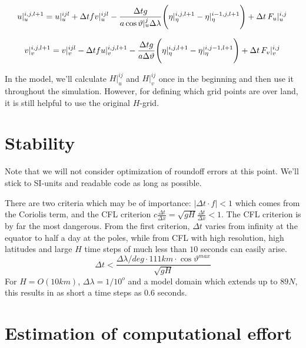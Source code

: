 \documentclass[a4paper]{article}
\begin{document}
\begin{equation}
  u|_u^{i,j,l+1} = u|_u^{ijl} 
    + \Delta t f v|_u^{ijl}
    - \frac{\Delta t g}{a\cos\vartheta|_u^j\Delta\lambda}
      \Biggl(\eta|_\eta^{i,j,l+1} - \eta|_\eta^{i-1,j,l+1}\Biggr) + \Delta t \,{F_u}\vert_{u}^{{i},{j}}\,
\end{equation}

\begin{equation}
  v|_v^{i,j,l+1} = v|_v^{ijl} 
    - \Delta t f u|_v^{i,j,l+1} 
    - \frac{\Delta t g}{a\Delta\vartheta}
      \Biggl(\eta|_\eta^{i,j,l+1} - \eta|_\eta^{i,j-1,l+1}\Biggr) + \Delta t \,{F_v}\vert_{v}^{{i},{j}}\,
\end{equation}

In the model, we'll calculate $H|_u^{ij}$ and $H|_v^{ij}$ once in the beginning and
then use it throughout the simulation. However, for defining which grid points are 
over land, it is still helpful to use the original $H$-grid.


\section{Stability}

Note that we will not consider optimization of roundoff errors at this point. We'll stick
to SI-units and readable code as long as possible.

There are two criteria which may be of importance: $|\Delta t\cdot f|<1$ which comes from the
Coriolis term, and the CFL criterion $c\frac{\Delta t}{\Delta x}=\sqrt{gH}\frac{\Delta t}{\Delta x}<1$. The CFL
criterion is by far the most dangerous. From the first criterion, $\Delta t$ varies from infinity
at the equator to half a day at the poles, while from CFL with high resolution, high latitudes and 
large $H$ time steps of much less than $10$ seconds can easily arise.
\begin{equation}
  \Delta t < \frac{\Delta\lambda/deg \cdot 111km \cdot \cos\vartheta^{max}}{\sqrt{gH}} 
\end{equation}
For $H=O(10km)$, $\Delta\lambda=1/10^{o}$ and a model domain which extends up to $89N$, this results in 
as short a time steps as $0.6$ seconds.


\section{Estimation of computational effort}
\end{document}
